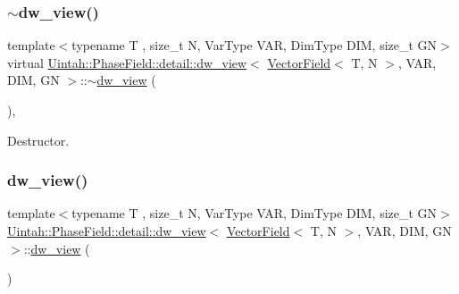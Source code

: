 \subsubsection{\texorpdfstring{$\sim$dw\+\_\+view()}{~dw\_view()}}
{\footnotesize\ttfamily template$<$typename T , size\+\_\+t N, Var\+Type V\+AR, Dim\+Type D\+IM, size\+\_\+t GN$>$ \\
virtual \hyperlink{classUintah_1_1PhaseField_1_1detail_1_1dw__view}{Uintah\+::\+Phase\+Field\+::detail\+::dw\+\_\+view}$<$ \hyperlink{structUintah_1_1PhaseField_1_1VectorField}{Vector\+Field}$<$ T, N $>$, V\+AR, D\+IM, GN $>$\+::$\sim$\hyperlink{classUintah_1_1PhaseField_1_1detail_1_1dw__view}{dw\+\_\+view} (\begin{DoxyParamCaption}{ }\end{DoxyParamCaption})\hspace{0.3cm}{\ttfamily [inline]}, {\ttfamily [virtual]}}



Destructor. 

\mbox{\label{classUintah_1_1PhaseField_1_1detail_1_1dw__view_3_01VectorField_3_01T_00_01N_01_4_00_01VAR_00_01DIM_00_01GN_01_4_a717de535076e8c4810bda5d6abb8357d}} 
\subsubsection{\texorpdfstring{dw\+\_\+view()}{dw\_view()}\hspace{0.1cm}{\footnotesize\ttfamily [3/3]}}
{\footnotesize\ttfamily template$<$typename T , size\+\_\+t N, Var\+Type V\+AR, Dim\+Type D\+IM, size\+\_\+t GN$>$ \\
\hyperlink{classUintah_1_1PhaseField_1_1detail_1_1dw__view}{Uintah\+::\+Phase\+Field\+::detail\+::dw\+\_\+view}$<$ \hyperlink{structUintah_1_1PhaseField_1_1VectorField}{Vector\+Field}$<$ T, N $>$, V\+AR, D\+IM, GN $>$\+::\hyperlink{classUintah_1_1PhaseField_1_1detail_1_1dw__view}{dw\+\_\+view} (\begin{DoxyParamCaption}\item[{const \hyperlink{classUintah_1_1PhaseField_1_1detail_1_1dw__view}{dw\+\_\+view}$<$ \hyperlink{structUintah_1_1PhaseField_1_1VectorField}{Vector\+Field}$<$ T, N $>$, V\+AR, D\+IM, GN $>$ \&}]{ }\end{DoxyParamCaption})\hspace{0.3cm}{\ttfamily [delete]}}



